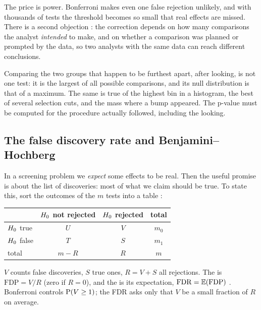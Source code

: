 The price is power. Bonferroni makes even one false rejection unlikely, and with
thousands of tests the threshold becomes so small that real effects are
missed. There is a second objection : the
correction depends
on how many comparisons the analyst \emph{intended} to make, and on whether a
comparison was planned or prompted by the data, so two analysts with the same
data can reach different conclusions.

\begin{pitfall}
Comparing the two groups that happen to be furthest apart, after looking,
is not one test: it is the largest of all possible comparisons, and its null
distribution is that of a maximum. The same is true of the highest bin in a
histogram, the best of several selection cuts, and the mass where a bump
appeared. The p-value must be computed for the procedure actually followed,
including the looking.
\end{pitfall}

\subsection{The false discovery rate and Benjamini--Hochberg}
\label{4b:sec:bh}

In a screening problem we \emph{expect} some effects to be real. Then the useful
promise is about the list of discoveries: most of what we claim should be true.
To state this, sort the outcomes of the $m$ tests into a table
:
\begin{center}
\begin{tabular}{lccc}
\toprule
 & $H_0$ not rejected & $H_0$ rejected & total\\
\midrule
$H_0$ true & $U$ & $V$ & $m_0$\\
$H_0$ false & $T$ & $S$ & $m_1$\\
total & $m-R$ & $R$ & $m$\\
\bottomrule
\end{tabular}
\end{center}
$V$ counts false discoveries, $S$ true ones, $R=V+S$ all rejections. The
 is $\mathrm{FDP}=V/R$ (zero if $R=0$), and
the  is its expectation,
$\mathrm{FDR}=\E(\mathrm{FDP})$ . Bonferroni controls
$\operatorname{P}(V\ge1)$; the FDR asks only that $V$ be a small fraction of $R$ on
average.

